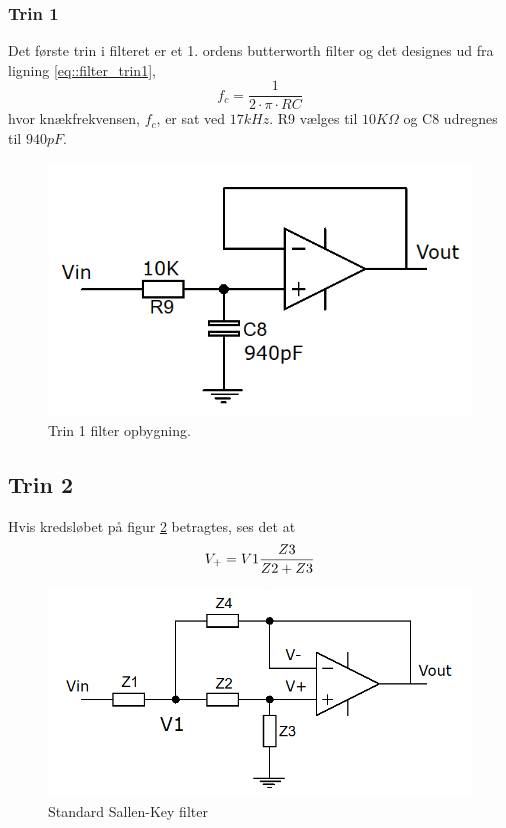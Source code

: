 \subsubsection{Trin 1} 
Det første trin i filteret er et 1. ordens butterworth filter og det designes ud fra ligning \ref{eq::filter_trin1},
\begin{equation}
	f_c = \dfrac{1}{2\cdot\pi\cdot R C} \label{eq::filter_trin1}
\end{equation} 	
hvor knækfrekvensen, $f_c$, er sat ved $17kHz$.
R9 vælges til $10K\Omega$ og C8 udregnes til $940pF$.
\begin{figure}[h!]
	\centering
	\includegraphics[scale=0.4]{./billeder/stage1a.png}
	\caption{Trin 1 filter opbygning.}
	\label{fig::stage1}
\end{figure}

\subsection{Trin 2}\label{sec::stage2}
Hvis kredsløbet på figur \ref{fig::anfilter_gensallen} betragtes, ses det at\\
\begin{equation}
	V_+ = V1\dfrac{Z3}{Z2+Z3}\\
	\vspace*{5mm}
\end{equation}

\begin{figure}[h!]
	\centering
	\includegraphics[scale = 0.4]{./billeder/komp_udregn}
	\caption{Standard Sallen-Key filter}
	\label{fig::anfilter_gensallen}
\end{figure}
\FloatBlock

